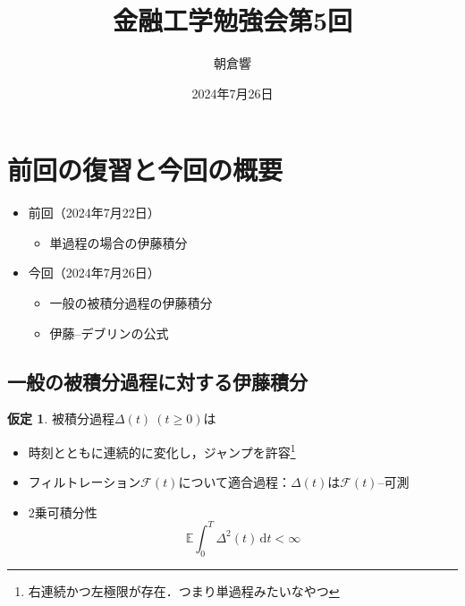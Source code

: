 \documentclass[a4paper, lualatex, ja=standard]{bxjsarticle}
\title{金融工学勉強会第5回}
\author{朝倉響}
\date{2024年7月26日}
\theoremstyle{definition}
\newtheorem*{assum*}{仮定}
\newcommand{\F}{\mathcal{F}}
\newcommand{\E}{\mathbb{E}}
\newcommand{\diff}{\mathrm{d}}
\begin{document}
\maketitle

\setcounter{section}{2}
\section*{前回の復習と今回の概要}
\begin{itemize}
  \item 前回（2024年7月22日）
  \begin{itemize}
    \item 単過程の場合の伊藤積分
  \end{itemize}
  \item 今回（2024年7月26日）
  \begin{itemize}
    \item 一般の被積分過程の伊藤積分
    \item 伊藤--デブリンの公式
  \end{itemize}
\end{itemize}

\setcounter{section}{4}
\setcounter{subsection}{2}
\subsection{一般の被積分過程に対する伊藤積分}
\begin{assum*}
  被積分過程$\Delta(t)\ (t\geq0)$は
  \begin{itemize}
    \item 時刻とともに連続的に変化し，ジャンプを許容\footnote{右連続かつ左極限が存在．つまり単過程みたいなやつ}
    \item フィルトレーション$\F(t)$について適合過程：$\Delta(t)$は$\F(t)$--可測
    \item $2$乗可積分性
    \begin{equation}
      \E\int_0^T\Delta^2(t)\,\diff t < \infty
    \end{equation}
  \end{itemize}
\end{assum*}
\end{document}
